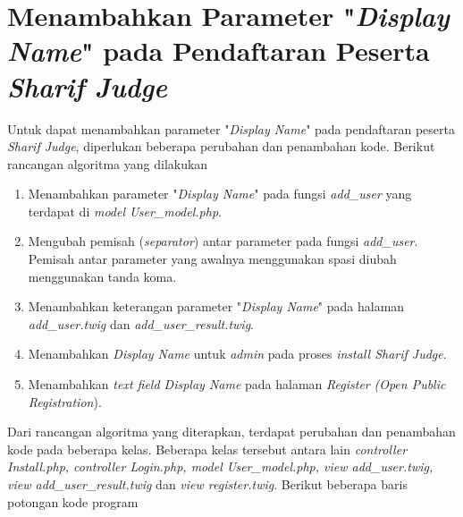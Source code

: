 \section{Menambahkan Parameter "\textit{Display Name}" pada Pendaftaran Peserta \textit{Sharif Judge}}
Untuk dapat menambahkan parameter "\textit{Display Name}" pada pendaftaran peserta \textit{Sharif Judge}, diperlukan beberapa perubahan dan penambahan kode. Berikut rancangan algoritma yang dilakukan
\begin{enumerate}
	\item Menambahkan parameter "\textit{Display Name}" pada fungsi \textit{add\_user} yang terdapat di \textit{model User\_model.php}.
	\item Mengubah pemisah (\textit{separator}) antar parameter pada fungsi \textit{add\_user}. Pemisah antar parameter yang awalnya menggunakan spasi diubah menggunakan tanda koma.
	\item Menambahkan keterangan parameter "\textit{Display Name}" pada halaman \textit{add\_user.twig} dan  \textit{add\_user\_result.twig}.
	\item Menambahkan \textit{Display Name} untuk \textit{admin} pada proses \textit{install Sharif Judge}.
	\item Menambahkan \textit{text field Display Name} pada halaman \textit{Register} \textit{(Open Public Registration}).
\end{enumerate}
Dari rancangan algoritma yang diterapkan, terdapat perubahan dan penambahan kode pada beberapa kelas. Beberapa kelas tersebut antara lain \textit{controller Install.php, controller Login.php, model User\_model.php, view add\_user.twig, view add\_user\_result.twig} dan \textit{view register.twig}.
Berikut beberapa baris potongan kode program

